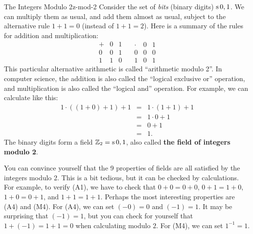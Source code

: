 \begin{example}{The Integers Modulo 2}{z-mod-2}
  Consider the set of {\em bits} (binary digits) $\mathop{\textrm{s}}\nolimits{0,1}$.
  We can multiply them as usual, and add them almost as usual, subject
  to the alternative rule $1+1=0$ (instead of $1+1=2$). Here is a
  summary of the rules for addition and multiplication:
  \begin{equation*}
    \begin{array}{l|ll}
      +&0&1 \\\hline
      0&0&1 \\
      1&1&0
    \end{array}
    \quad
    \begin{array}{l|ll}
      \cdot&0&1 \\\hline
      0&0&0 \\
      1&0&1
    \end{array}
  \end{equation*}
  This particular alternative arithmetic is called ``arithmetic modulo
  2''.   In computer science, the addition is also called the ``logical
  exclusive or'' operation, and multiplication is also called the
  ``logical and'' operation.  For example, we can calculate like this:
  \begin{equation*}
    \begin{array}{lll}
      1\cdot((1+0)+1) + 1 &=& 1\cdot(1+1) + 1\\
                          &=& 1\cdot 0 + 1\\
                          &=& 0 + 1\\
                          &=& 1.
    \end{array}
  \end{equation*}
  The binary digits form a field $\mathbb{Z}_2 = \mathop{\textrm{s}}\nolimits{0,1}$, also
  called \textbf{the field of integers modulo 2}.
\end{example}

You can convince yourself that the 9 properties of fields are all
satisfied by the integers modulo 2. This is a bit tedious, but it can
be checked by calculations.  For example, to verify (A1), we have to
check that $0+0=0+0$, $0+1=1+0$, $1+0=0+1$, and $1+1=1+1$. Perhaps the
most interesting properties are (A4) and (M4). For (A4), we can set
$(-0)=0$ and $(-1)=1$. It may be surprising that $(-1)=1$, but you can
check for yourself that $1+(-1)=1+1=0$ when calculating modulo
$2$. For (M4), we can set $1^{-1} = 1$.

